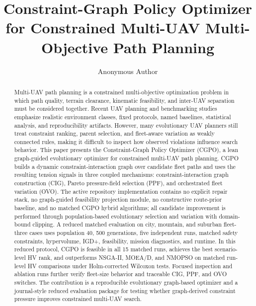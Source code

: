 \documentclass[a4paper,fleqn]{cas-dc}
\begin{document}
\let\WriteBookmarks\relax
\def\floatpagepagefraction{1}
\def\textpagefraction{.001}


\title[mode=title]{Constraint-Graph Policy Optimizer for Constrained Multi-UAV Multi-Objective Path Planning}

\author[1]{Anonymous Author}

\begin{abstract}
Multi-UAV path planning is a constrained multi-objective optimization problem in which path quality, terrain clearance, kinematic feasibility, and inter-UAV separation must be considered together. Recent UAV planning and benchmarking studies emphasize realistic environment classes, fixed protocols, named baselines, statistical analysis, and reproducibility artifacts. However, many evolutionary UAV planners still treat constraint ranking, parent selection, and fleet-aware variation as weakly connected rules, making it difficult to inspect how observed violations influence search behavior. This paper presents the Constraint-Graph Policy Optimizer (CGPO), a lean graph-guided evolutionary optimizer for constrained multi-UAV path planning. CGPO builds a dynamic constraint-interaction graph over candidate fleet paths and uses the resulting tension signals in three coupled mechanisms: constraint-interaction graph construction (CIG), Pareto pressure-field selection (PPF), and orchestrated fleet variation (OVO). The active repository implementation contains no explicit repair stack, no graph-guided feasibility projection module, no constructive route-prior baseline, and no matched CGPO hybrid algorithms; all candidate improvement is performed through population-based evolutionary selection and variation with domain-bound clipping. A reduced matched evaluation on city, mountain, and suburban fleet-three cases uses population 40, 500 generations, five independent runs, matched safety constraints, hypervolume, IGD+, feasibility, mission diagnostics, and runtime. In this reduced protocol, CGPO is feasible in all 15 matched runs, achieves the best scenario-level HV rank, and outperforms NSGA-II, MOEA/D, and NMOPSO on matched run-level HV comparisons under Holm-corrected Wilcoxon tests. Focused inspection and ablation runs further verify fleet-size behavior and traceable CIG, PPF, and OVO switches. The contribution is a reproducible evolutionary graph-based optimizer and a journal-style reduced evaluation package for testing whether graph-derived constraint pressure improves constrained multi-UAV search.
\end{abstract}
\end{document}
